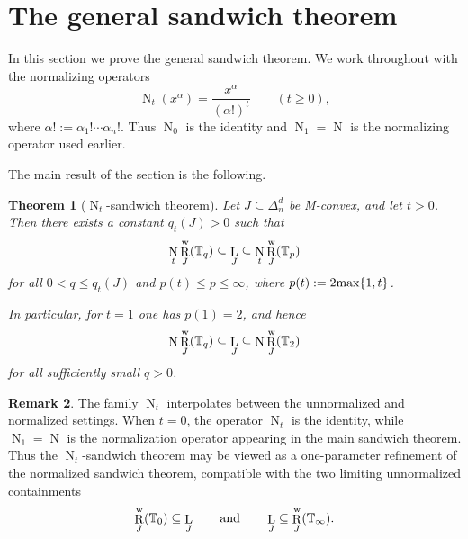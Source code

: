 \documentclass[12pt]{amsart}
\newtheorem{theorem}{Theorem}[section]
\theoremstyle{definition}
\newtheorem{remark}[theorem]{Remark}
\newcommand{\1}{\mathbf{1}}
\DeclareMathOperator{\upN}{N}   %
\DeclareMathOperator{\upL}{L}   %
\DeclareMathOperator{\upR}{R}   %
\newcommand\T{{\mathbb T}}
\renewcommand\max{\textup{max}}
\renewcommand\leq{\leqslant}
\newcommand{\mk}[2][]{\todo[color=orange, #1]{\textbf{Mario}: #2}}
\newcommand\ol{\texorpdfstring{\textbf{Oliver:} }{Oliver: }}
\begin{document}
\section{The general sandwich theorem}
\label{sec:general-sandwich}

In this section we prove the general sandwich theorem.  We work throughout with
the normalizing operators
\[
\upN_t(x^\alpha)=\frac{x^\alpha}{(\alpha!)^t}
\qquad (t\ge 0),
\]
where $\alpha!:=\alpha_1!\cdots \alpha_n!$.  Thus $\upN_0$ is the identity and
$\upN_1=\upN$ is the normalizing operator used earlier.

The main result of the section is the following.

\begin{theorem}[$\upN_t$-sandwich theorem]
\label{thm:Nt-sandwich}
Let $J\subseteq \Delta_n^d$ be M-convex, and let $t>0$.  Then there exists a
constant $q_t(J)>0$ such that
\[
\upN_t\upR_J^{\rm w}(\T_q)\subseteq \upL_J \subseteq \upN_t\upR_J^{\rm w}(\T_p)
\]
for all $0<q\le q_t(J)$ and $p(t) \leq p \leq \infty$, where $p(t):=2\max\{1,t\}$.

In particular, for $t=1$ one has $p(1)=2$, and hence
\[
\upN\upR_J^{\rm w}(\T_q)\subseteq \upL_J
\subseteq
\upN\upR_J^{\rm w}(\T_2)
\]
for all sufficiently small $q>0$.
\end{theorem}


\begin{remark}
The family $\upN_t$ interpolates between the unnormalized and normalized
settings.  When $t=0$, the operator $\upN_t$ is the identity, while
$\upN_1=\upN$ is the normalization operator appearing in the main
sandwich theorem.  Thus the $\upN_t$-sandwich theorem may be viewed as a
one-parameter refinement of the normalized sandwich theorem, compatible with
the two limiting unnormalized containments
\[
\upR_J^{\rm w}(\mathbb T_0)\subseteq \upL_J
\qquad\text{and}\qquad
\upL_J\subseteq \upR_J^{\rm w}(\mathbb T_\infty).
\]

\end{remark}
\end{document}
